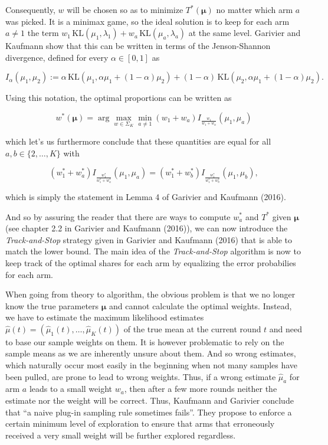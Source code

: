 \documentclass[11pt,]{article}
\newcommand{\KL}{\,\text{KL}}
\begin{document}
Consequently, \(w\) will be chosen so as to minimize \(T^*(\bm{\mu})\)
no matter which arm \(a\) was picked. It is a minimax game, so the ideal
solution is to keep for each arm \(a \neq 1\) the term
\(w_1 \KL(\mu_1, \lambda_1) + w_a \KL(\mu_a, \lambda_a)\) at the same
level. Garivier and Kaufmann show that this can be written in terms of
the Jenson-Shannon divergence, defined for every \(\alpha \in [0,1]\) as

\begin{equation*}
I_{\alpha}(\mu_1, \mu_2) := \alpha \KL(\mu_1, \alpha \mu_1 + (1-\alpha) \mu_2) + (1-\alpha) \KL(\mu_2, \alpha \mu_1 + (1-\alpha) \mu_2).
\end{equation*}

Using this notation, the optimal proportions can be written as

\begin{equation*}
w^*(\bm{\mu}) = \arg \max_{w \in \Sigma_K} \min_{a \neq 1} (w_1 + w_a) I_{\frac{w_1}{w_1+w_a}}(\mu_1, \mu_a)
\end{equation*}

which let's us furthermore conclude that these quantities are equal for
all \(a,b \in \{2,\dots, K\}\) with

\begin{equation*}
(w_1^* + w_a^*) I_{\frac{w_1^*}{w_1^*+w_a^*}}(\mu_1, \mu_a) = (w_1^* + w_b^*) I_{\frac{w_1^*}{w_1^*+w_b^*}}(\mu_1, \mu_b),
\end{equation*}

which is simply the statement in Lemma 4 of Garivier and Kaufmann
(2016).

And so by assuring the reader that there are ways to compute \(w_a^*\)
and \(T^*\) given \(\bm{\mu}\) (see chapter 2.2 in Garivier and Kaufmann
(2016)), we can now introduce the \emph{Track-and-Stop} strategy given
in Garivier and Kaufmann (2016) that is able to match the lower bound.
The main idea of the \emph{Track-and-Stop} algorithm is now to keep
track of the optimal shares for each arm by equalizing the error
probabilies for each arm.

When going from theory to algorithm, the obvious problem is that we no
longer know the true parameters \(\bm{\mu}\) and cannot calculate the
optimal weights. Instead, we have to estimate the maximum likelihood
estimates \(\hat{\mu}(t) = (\hat{\mu}_1(t), \dots, \hat{\mu}_K(t))\) of
the true mean at the current round \(t\) and need to base our sample
weights on them. It is however problematic to rely on the sample means
as we are inherently unsure about them. And so wrong estimates, which
naturally occur most easily in the beginning when not many samples have
been pulled, are prone to lead to wrong weights. Thus, if a wrong
estimate \(\hat{\mu}_a\) for arm \(a\) leads to a small weight \(w_a\),
then after a few more rounds neither the estimate nor the weight will be
correct. Thus, Kaufmann and Garivier conclude that ``a naive plug-in
sampling rule sometimes fails''. They propose to enforce a certain
minimum level of exploration to ensure that arms that erroneously
received a very small weight will be further explored regardless.
\end{document}
